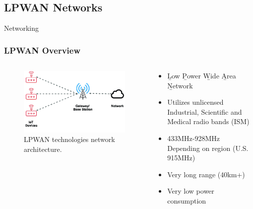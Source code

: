 \documentclass{beamer}
\begin{document}
\subsection{LPWAN Networks}

  \begin{frame}{Networking}
    \frametitle{LPWAN Overview}
    \begin{columns}
      \begin{column}{0.4\textwidth}
        \begin{figure}[htbp]
          \centering
          \includegraphics[width=\textwidth]{LPWAN-technologies-network-architecture.png}
          \caption{LPWAN technologies network architecture.\cite{LoRaNetworkFernandez}}
          \label{fig:LPWAN_Network_architecture}
        \end{figure}
      \end{column}
      \begin{column}{0.6\textwidth}
        \begin{itemize}
          \item \b{L}ow \b{P}ower \b{W}ide \b{A}rea \b{N}etwork
          \item Utilizes unlicensed Industrial, Scientific and Medical radio bands (ISM)
          \item 433MHz-928MHz Depending on region (U.S. 915MHz)
          \item Very long range (40km+)
          \item Very low power consumption
        \end{itemize}
      \end{column}
    \end{columns}
  \end{frame}
\end{document}
